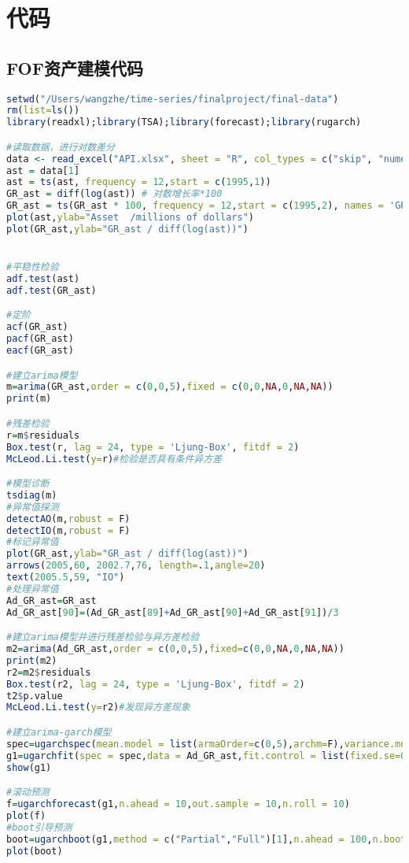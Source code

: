 \section{代码}
\subsection{FOF资产建模代码}
\begin{lstlisting}[language=R,frame=single]
setwd("/Users/wangzhe/time-series/finalproject/final-data")
rm(list=ls())
library(readxl);library(TSA);library(forecast);library(rugarch)

#读取数据，进行对数差分
data <- read_excel("API.xlsx", sheet = "R", col_types = c("skip", "numeric", "numeric"))
ast = data[1] 
ast = ts(ast, frequency = 12,start = c(1995,1)) 
GR_ast = diff(log(ast)) # 对数增长率*100
GR_ast = ts(GR_ast * 100, frequency = 12,start = c(1995,2), names = 'GR_ast')
plot(ast,ylab="Asset  /millions of dollars")
plot(GR_ast,ylab="GR_ast / diff(log(ast))")


#平稳性检验
adf.test(ast)
adf.test(GR_ast)

#定阶
acf(GR_ast)
pacf(GR_ast)
eacf(GR_ast)

#建立arima模型
m=arima(GR_ast,order = c(0,0,5),fixed = c(0,0,NA,0,NA,NA))
print(m)

#残差检验
r=m$residuals
Box.test(r, lag = 24, type = 'Ljung-Box', fitdf = 2)
McLeod.Li.test(y=r)#检验是否具有条件异方差

#模型诊断
tsdiag(m)
#异常值探测
detectAO(m,robust = F)
detectIO(m,robust = F)
#标记异常值
plot(GR_ast,ylab="GR_ast / diff(log(ast))")
arrows(2005,60, 2002.7,76, length=.1,angle=20)
text(2005.5,59, "IO")
#处理异常值
Ad_GR_ast=GR_ast
Ad_GR_ast[90]=(Ad_GR_ast[89]+Ad_GR_ast[90]+Ad_GR_ast[91])/3

#建立arima模型并进行残差检验与异方差检验
m2=arima(Ad_GR_ast,order = c(0,0,5),fixed=c(0,0,NA,0,NA,NA))
print(m2)
r2=m2$residuals
Box.test(r2, lag = 24, type = 'Ljung-Box', fitdf = 2)
t2$p.value
McLeod.Li.test(y=r2)#发现异方差现象

#建立arima-garch模型
spec=ugarchspec(mean.model = list(armaOrder=c(0,5),archm=F),variance.model = list(model="sGARCH",garchOrder=c(1,1)),distribution.model ="std",fixed.pars = list(ma4=0) )
g1=ugarchfit(spec = spec,data = Ad_GR_ast,fit.control = list(fixed.se=0,stationarity=1),out.sample = 10)
show(g1)

#滚动预测
f=ugarchforecast(g1,n.ahead = 10,out.sample = 10,n.roll = 10)
plot(f)
#boot引导预测
boot=ugarchboot(g1,method = c("Partial","Full")[1],n.ahead = 100,n.bootpred = 269)
plot(boot)
\end{lstlisting}

